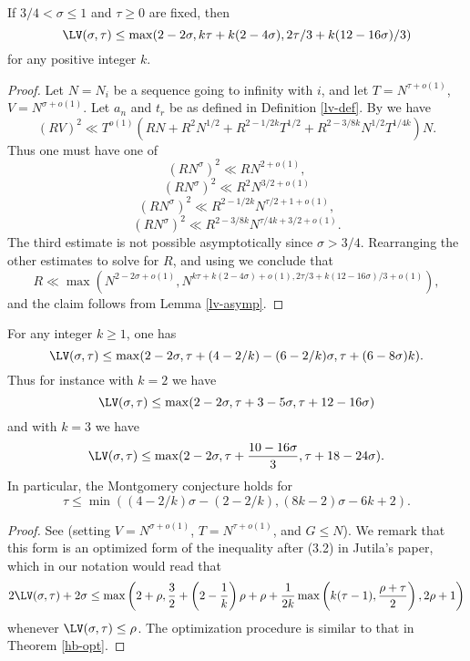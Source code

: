\begin{lemma} If $3/4 < \sigma \leq 1$ and $\tau \geq 0$ are fixed, then
    $$ \LV(\sigma,\tau) \leq \max( 2-2\sigma, k\tau + k(2-4\sigma), 2\tau/3 + k(12-16\sigma)/3 )$$
    for any positive integer $k$.
    \end{lemma}
    
\begin{proof}
    Let $N = N_i$ be a sequence going to infinity with $i$, and let $T = N^{\tau + o(1)}$, $V = N^{\sigma + o(1)}$. Let $a_n$ and $t_r$ be as defined in Definition \ref{lv-def}. By \cite[Lemma~6]{heathbrown_large_1979} we have
    $$ (R V)^2 \ll T^{o(1)}( RN + R^2 N^{1/2} + R^{2-1/2k} T^{1/2} + R^{2-3/8k} N^{1/2} T^{1/4k}) N.$$
    Thus one must have one of
$$ (R N^\sigma)^2 \ll RN^{2+o(1)},$$
$$ (R N^\sigma)^2 \ll R^2 N^{3/2+o(1)}$$
$$ (R N^\sigma)^2 \ll R^{2-1/2k} N^{\tau/2+1+o(1)},$$
$$ (R N^\sigma)^2 \ll R^{2-3/8k} N^{\tau/4k + 3/2+ o(1)}.$$
The third estimate is not possible asymptotically since $\sigma > 3/4$.  Rearranging the other estimates to solve for $R$, and using we conclude that
$$ R \ll \max\left( N^{2-2\sigma+o(1)}, N^{k\tau + k(2-4\sigma)+o(1), 2\tau/3 + k(12-16\sigma)/3 + o(1)}\right),$$
and the claim follows from Lemma \ref{lv-asymp}. 
\end{proof}
    
\begin{theorem}\label{jutila-lvt}  For any integer $k \geq 1$, one has
$$ \LV(\sigma,\tau) \leq \max(2-2\sigma, \tau + (4-2/k) - (6-2/k)\sigma, \tau + (6-8\sigma)k).$$
Thus for instance with $k=2$ we have
$$ \LV(\sigma,\tau) \leq \max(2-2\sigma, \tau + 3 - 5\sigma, \tau + 12-16\sigma)$$
and with $k=3$ we have
$$ \LV(\sigma,\tau) \leq \max(2-2\sigma, \tau + \frac{10-16\sigma}{3}, \tau + 18-24\sigma).$$
In particular, the Montgomery conjecture holds for
$$ \tau \leq \min( (4-2/k)\sigma - (2-2/k), (8k-2)\sigma - 6k + 2).$$
\end{theorem}

\begin{proof} See \cite[(1.4)]{jutila_zero_density_1977} (setting $V = N^{\sigma+o(1)}$, $T = N^{\tau+o(1)}$, and $G \leq N$).  We remark that this form is an optimized form of the inequality after (3.2) in Jutila's paper, which in our notation would read that
$$ 2\LV(\sigma,\tau) + 2\sigma \leq \max \left(2 + \rho, \frac{3}{2} + \left(2 - \frac{1}{k}\right)\rho + \rho + \frac{1}{2k}\max\left(k(\tau-1), \frac{\rho+\tau}{2}\right), 2\rho + 1\right)$$
whenever $\LV(\sigma,\tau) \leq \rho$.  The optimization procedure is similar to that in Theorem \ref{hb-opt}.
\end{proof}

